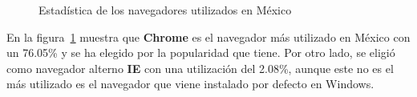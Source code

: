 \begin{itemize}
			\begin{figure}[htbp!]
				\begin{center}
					\caption{Estadística de los navegadores utilizados en México}
					\label{fig:navegadores}
				\end{center}
			\end{figure}
			
			En la figura~\ref{fig:navegadores} muestra que \textbf{Chrome} es el navegador más utilizado en México con un 76.05\% y se ha elegido por la popularidad que tiene. Por otro lado, se eligió como navegador alterno \textbf{IE} con una utilización del 2.08\%, aunque este no es el más utilizado es el navegador que viene instalado por defecto en Windows.
		\end{itemize}
	
